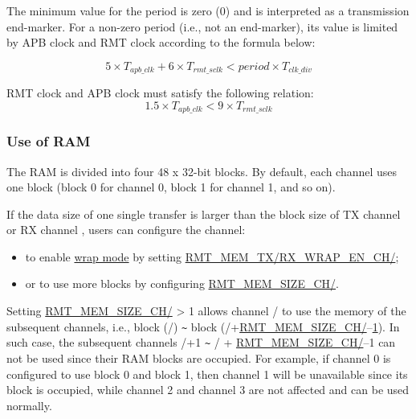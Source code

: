 \documentclass[main\_\_EN.tex]{subfiles}
\begin{document}
The minimum value for the period is zero (0) and is interpreted as a transmission end-marker. For a non-zero period (i.e., not an end-marker), its value is limited by APB clock and RMT clock according to the formula below:

\begin{equation}\label{eq:rmt-period-value}
5 \times T_{apb\_clk} + 6 \times T_{rmt\_sclk} < period \times T_{clk\_div}
\end{equation}

\begin{tiplisting}
RMT clock and APB clock must satisfy the following relation:
    \begin{equation}
    1.5 \times T_{apb\_clk} < 9 \times T_{rmt\_sclk}
    \end{equation}
\end{tiplisting}

\subsubsection{Use of RAM}

The RAM is divided into four 48 x 32-bit blocks. By default, each channel uses one block (block 0 for channel 0, block 1 for channel 1, and so on). 

If the data size of one single transfer is larger than the block size of TX channel  or RX channel , users can configure the channel:
\begin{itemize}
    \item to enable \hyperref[sec:wrap-tx-mode]{wrap mode} by setting \hyperref[fielddesc:RMTMEMTXWRAPENCHN]{RMT\_MEM\_TX/RX\_WRAP\_EN\_CH/};
    \item or to use more blocks by configuring \hyperref[fielddesc:RMTMEMSIZECHN]{RMT\_MEM\_SIZE\_CH/}.
\end{itemize}

Setting \hyperref[fielddesc:RMTMEMSIZECHN]{RMT\_MEM\_SIZE\_CH/} > 1 allows channel / to use the memory of the subsequent channels, i.e., block (/) \verb+~+ block (/+\hyperref[fielddesc:RMTMEMSIZECHN]{RMT\_MEM\_SIZE\_CH/$–$1}). In such case, the subsequent channels /+1 \verb+~+ / + \hyperref[fielddesc:RMTMEMSIZECHN]{RMT\_MEM\_SIZE\_CH/}$–$1 can not be used since their RAM blocks are occupied. For example, if channel 0 is configured to use block 0 and block 1, then channel 1 will be unavailable since its block is occupied, while channel 2 and channel 3 are not affected and can be used normally.
\end{document}
